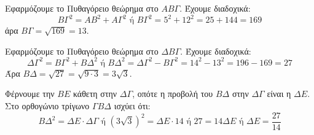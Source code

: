 \begin{alist}
    \item Εφαρμόζουμε το Πυθαγόρειο θεώρημα στο $AB\Gamma$. Έχουμε διαδοχικά:
    \[ B\Gamma^2 = AB^2 + A\Gamma^2 \text{ ή } B\Gamma^2 = 5^2 + 12^2 = 25 + 144 = 169 \]
    άρα $B\Gamma = \sqrt{169} = 13$.

    \item
    \begin{rlist}
        \item Εφαρμόζουμε το Πυθαγόρειο θεώρημα στο $\Delta B\Gamma$. Έχουμε διαδοχικά:
        \[ \Delta\Gamma^2 = B\Gamma^2 + B\Delta^2 \text{ ή } B\Delta^2 = \Delta\Gamma^2 - B\Gamma^2 = 14^2 - 13^2 = 196 - 169 = 27 \]
        Άρα $B\Delta = \sqrt{27} = \sqrt{9 \cdot 3} = 3\sqrt{3}$.
        \item Φέρνουμε την $BE$ κάθετη στην $\Delta\Gamma$, οπότε η προβολή του $B\Delta$ στην $\Delta\Gamma$ είναι η $\Delta E$.
        Στο ορθογώνιο τρίγωνο $\Gamma B\Delta$ ισχύει ότι:
        \[ B\Delta^2 = \Delta E \cdot \Delta\Gamma \text{ ή } (3\sqrt{3})^2 = \Delta E \cdot 14 \text{ ή } 27 = 14\Delta E \text{ ή } \Delta E = \frac{27}{14} \]
    \end{rlist}
\end{alist}